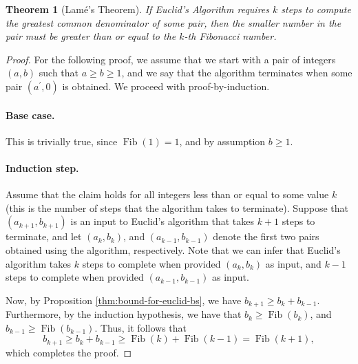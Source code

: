 \documentclass{article}
\newtheorem{theorem}{Theorem}
\DeclareMathOperator{\fib}{Fib}
\begin{document}
\vspace{5mm}





\begin{theorem}[Lam\'e's Theorem]
  If Euclid's Algorithm requires $k$ steps to compute the greatest common
  denominator of some pair, then the smaller number in the pair must be greater
  than or equal to the $k$-th Fibonacci number.
\end{theorem}

\begin{proof}
  For the following proof, we assume that we start with a pair of integers
  $(a, b)$ such that $a \geq b \geq 1$, and we say that the algorithm terminates
  when some pair $(a^{\prime}, 0)$ is obtained.  We proceed with
  proof-by-induction.

  \paragraph{Base case.}  This is trivially true, since $\fib(1) = 1$, and by
  assumption $b \geq 1$.

  \paragraph{Induction step.}  Assume that the claim holds for all integers less
  than or equal to some value $k$ (this is the number of steps that the
  algorithm takes to terminate).  Suppose that $(a_{k + 1}, b_{k + 1})$ is an
  input to Euclid's algorithm that takes $k + 1$ steps to terminate, and let
  $(a_k, b_k)$, and $(a_{k - 1}, b_{k - 1})$ denote the first two pairs obtained
  using the algorithm, respectively.  Note that we can infer that Euclid's
  algorithm takes $k$ steps to complete when provided $(a_k, b_k)$ as input, and
  $k - 1$ steps to complete when provided $(a_{k - 1}, b_{k - 1})$ as input.

  Now, by Proposition \ref{thm:bound-for-euclid-bs}, we have
  $b_{k + 1} \geq b_k + b_{k - 1}$.  Furthermore, by the induction hypothesis,
  we have that $b_k \geq \fib(b_k)$, and $b_{k - 1} \geq \fib(b_{k - 1})$.
  Thus, it follows that
  \begin{equation*}
    b_{k + 1} \geq b_k + b_{k - 1} \geq \fib(k) + \fib(k - 1) = \fib(k +1),
  \end{equation*}
  which completes the proof.
\end{proof}
\vspace{5mm}
\end{document}
